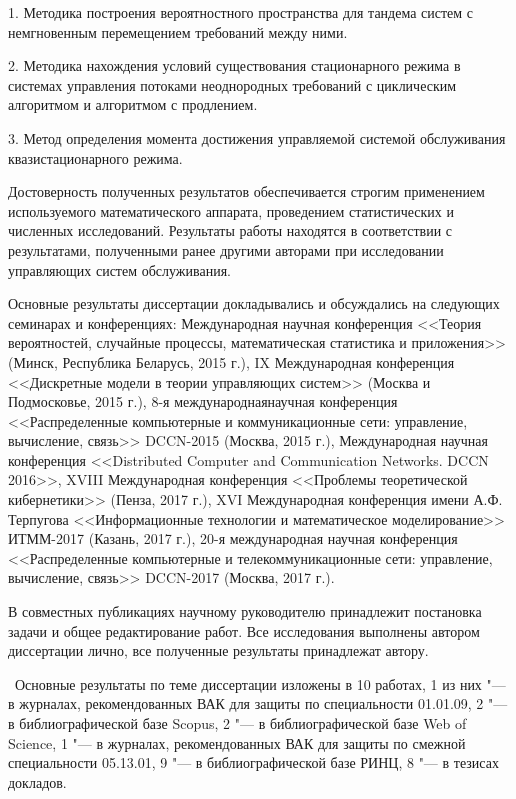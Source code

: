 \documentclass[14pt]{extarticle}
\theoremstyle{theorem}
\theoremstyle{remark}
\begin{document}
{}

1. Методика построения вероятностного пространства для тандема систем с немгновенным перемещением требований между ними.

2. Методика нахождения условий существования стационарного режима в системах управления потоками неоднородных требований с циклическим алгоритмом и алгоритмом с продлением.

3. Метод определения момента достижения управляемой системой обслуживания квазистационарного режима.



{\probation} Достоверность полученных результатов обеспечивается строгим применением используемого математического аппарата, проведением статистических и численных исследований. Результаты работы находятся в соответствии с результатами, полученными ранее другими авторами при исследовании управляющих систем обслуживания.

Основные результаты диссертации докладывались и обсуждались на следующих семинарах и конференциях:
Международная научная конференция <<Теория вероятностей, случайные процессы, математическая статистика и приложения>> (Минск, Республика Беларусь, 2015 г.), IX Международная конференция <<Дискретные модели в теории управляющих систем>> (Москва и Подмосковье, 2015 г.), 
8-я международнаянаучная конференция <<Распределенные компьютерные и коммуникационные сети: управление, вычисление, связь>> DCCN-2015 (Москва, 2015 г.), Международная научная конференция <<Distributed Computer and Communication Networks. DCCN 2016>>, XVIII Международная конференция <<Проблемы теоретической кибернетики>> (Пенза, 2017 г.),   XVI Международная конференция имени А.Ф. Терпугова <<Информационные технологии и математическое моделирование>> ИТММ-2017 (Казань, 2017 г.), 20-я международная научная конференция <<Распределенные компьютерные и телекоммуникационные сети: управление, вычисление, связь>> DCCN-2017 (Москва, 2017 г.).



{\contribution} В совместных публикациях научному руководителю принадлежит постановка задачи и общее редактирование работ. Все исследования выполнены автором диссертации лично, все полученные результаты принадлежат автору. 



	\publications\ Основные результаты по теме диссертации изложены в 10 работах, 
	1 из них "--- в журналах, рекомендованных ВАК для защиты по специальности 01.01.09,
	2 "--- в библиографической базе Scopus, 2 "--- в библиографической базе Web of Science, 1 "--- в журналах, рекомендованных ВАК для защиты по смежной специальности 05.13.01, 9 "--- в библиографической базе РИНЦ,
	8 "--- в тезисах докладов. 
\end{document}
